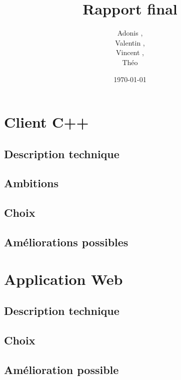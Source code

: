 \documentclass[a4paper]{article}
\title{Rapport final}
\author{Adonis \bsc{Najimi},\\
 Valentin \bsc{Stern},\\
 Vincent \bsc{Albert},\\
 Théo \bsc{Gerriet}}
\date{\today}
\begin{document}
\maketitle
\newpage

\section{Client C++}
    \subsection{Description technique}
    

    \subsection{Ambitions}
    

    \subsection{Choix}
    
    
    \subsection{Améliorations possibles}
    

\newpage
\section{Application Web}
	\subsection{Description technique}
	
	\subsection{Choix}
	
	\subsection{Amélioration possible}
	
\newpage
\tableofcontents
\end{document}
